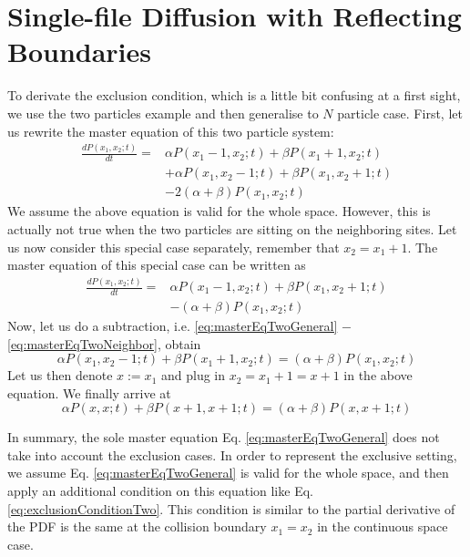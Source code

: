 
\chapter{Single-file Diffusion with Reflecting Boundaries}
To derivate the exclusion condition, which is a little bit confusing at a first sight, we use the two particles example and then generalise to $N$ particle case.
First, let us rewrite the master equation of this two particle system:
\begin{equation}
    \begin{aligned}
        \label{eq:masterEqTwoGeneral}
    \frac{d P(x_1, x_2; t)}{dt} = & \alpha P(x_1-1,x_2;t) + \beta P(x_1+1,x_2;t) \\ 
    & + \alpha P(x_1, x_2-1; t) + \beta P(x_1, x_2+1; t)  \\ 
    & - 2(\alpha+\beta)P(x_1, x_2; t)
    \end{aligned}
\end{equation}
We assume the above equation is valid for the whole space. However, this is actually not true when the two particles are sitting on the neighboring sites. Let us now consider this special case separately, remember that $x_2 = x_1 + 1$. The master equation of this special case can be written as
\begin{equation}
    \begin{aligned}
        \label{eq:masterEqTwoNeighbor}
        \frac{d P(x_1, x_2; t)}{dt} = 
        & \alpha P(x_1-1,x_2;t) + \beta P(x_1, x_2+1; t)  \\ 
    & - (\alpha+\beta)P(x_1, x_2; t)
    \end{aligned}
\end{equation}
Now, let us do a subtraction, i.e. \eqref{eq:masterEqTwoGeneral} $-$ \eqref{eq:masterEqTwoNeighbor}, obtain
\begin{equation}
    \alpha P(x_1, x_2-1; t) + \beta P(x_1 + 1, x_2; t) = (\alpha + \beta)P(x_1, x_2; t)
\end{equation}
Let us then denote $x:=x_1$ and plug in $x_2 = x_1+1 = x+1$ in the above equation. We finally arrive at
\begin{equation}
    \label{eq:exclusionConditionTwo}
    \alpha P(x, x; t) + \beta P(x+1, x+1; t) = (\alpha + \beta)P(x, x+1; t)
\end{equation}

In summary, the sole master equation Eq. \eqref{eq:masterEqTwoGeneral} does not take into account the exclusion cases. In order to represent the exclusive setting, we assume Eq. \eqref{eq:masterEqTwoGeneral} is valid for the whole space, and then apply an additional condition on this equation like Eq. \eqref{eq:exclusionConditionTwo}. This condition is similar to the partial derivative of the PDF is the same at the collision boundary $x_1 = x_2$ in the continuous space case. 

